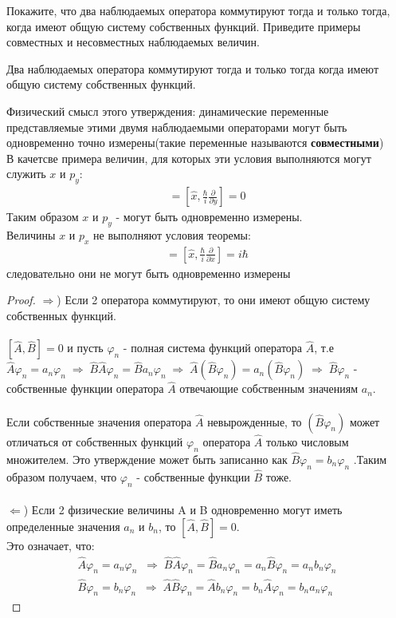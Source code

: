 \documentclass[__main__.tex]{subfiles}
\begin{document}
Покажите, что два наблюдаемых оператора коммутируют тогда и только тогда, когда имеют общую систему собственных функций. Приведите примеры совместных и несовместных наблюдаемых величин.\\ 

\begin{theorem}
Два наблюдаемых оператора коммутируют тогда и только тогда когда имеют общую систему собственных функций.
\end{theorem}
Физический смысл этого утверждения: динамические переменные представляемые этими двумя наблюдаемыми операторами могут быть одновременно точно измерены(такие переменные называются \textbf{совместными})\\

В качетсве примера величин, для которых эти условия выполняются могут служить $x$ и $p_y$: 
\begin{gather*}
[\hat{x},\hat{p_y}] = \left[\hat{x},\frac{\hbar}{i}\frac{\partial}{\partial y}\right] = 0
\end{gather*}
Таким образом $x$ и $p_y$ - могут быть одновременно измерены.\\
Величины $x$ и $p_x$ не выполняют условия теоремы:
\begin{gather*}
[\hat{x},\hat{p_x}] = \left[\hat{x},\frac{\hbar}{i}\frac{\partial}{\partial x}\right] = i\hbar
\end{gather*}
следовательно они не могут быть одновременно измерены
\begin{proof}
$\Rightarrow$) Если 2 оператора коммутируют, то они имеют общую систему собственных функций.\\\\
$[\hat{A},\hat{B}]=0$ и пусть ${\varphi_n}$ - полная система функций оператора $\hat{A}$, т.е $\hat{A}\varphi_n = a_n\varphi_n \; \Rightarrow \; \hat{B}\hat{A}\varphi_n = \hat{B}a_n\varphi_n \; \Rightarrow \; \hat{A}(\hat{B}\varphi_n) = a_n(\hat{B}\varphi_n) \; \Rightarrow \; \hat{B}\varphi_n$ - собственные функции оператора $\hat{A}$ отвечающие собственным значениям $a_n$.  \\\\

Если собственные значения оператора $\hat{A}$ невырожденные, то $(\hat{B}\varphi_n)$ может отличаться от собственных функций $\varphi_n$ оператора $\hat{A}$ только числовым множителем. Это утверждение может быть записанно как $\hat{B}\varphi_n = b_n\varphi_n$ .Таким образом получаем, что $\varphi_n$ - собственные функции $\hat{B}$ тоже.\\\\
$\Leftarrow$) Если 2 физические величины A и B одновременно могут иметь определенные значения $a_n$ и $b_n$, то $[\hat{A},\hat{B}] = 0$.\\

Это означает, что:
\begin{gather*}
\hat{A}\varphi_n = a_n\varphi_n \;\; \Rightarrow \; \hat{B}\hat{A}\varphi_n=\hat{B}a_n\varphi_n=a_n\hat{B}\varphi_n=a_nb_n\varphi_n\\
\hat{B}\varphi_n = b_n\varphi_n \;\; \Rightarrow \;
\hat{A}\hat{B}\varphi_n=\hat{A}b_n\varphi_n = b_n\hat{A}\varphi_n = b_na_n\varphi_n
\end{gather*}
\end{proof}
\end{document}
